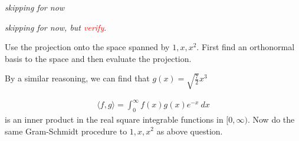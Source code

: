 \begin{solution}
  \textit{skipping for now}
\end{solution}

\begin{solution}
  \textit{skipping for now, but \textcolor{red}{verify}}.
\end{solution}

\begin{solution}
  Use the projection onto the space spanned by $1, x, x^2$. First
  find an orthonormal basis to the space and then evaluate the projection.

  By a similar reasoning, we can find that $g(x) = \sqrt{\frac{7}{2}}x^3$
\end{solution}

\begin{solution}
  \begin{align*}
    \langle f , g \rangle  = \int_{0}^{\infty}  f(x)g(x)e^{-x} \ dx
  \end{align*}
  is an inner product in the real square integrable functions in $[0,
  \infty)$. Now do the same Gram-Schmidt procedure to $1, x, x^2$ as
  above question.
\end{solution}
